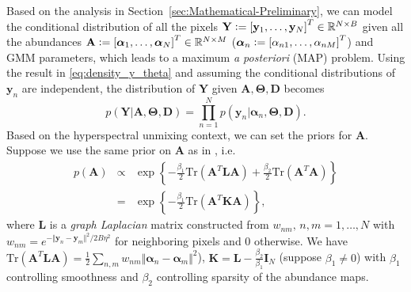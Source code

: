 \documentclass[twocolumn,english]{IEEEtran}
\theoremstyle{plain}
\begin{document}
Based on the analysis in Section~\ref{sec:Mathematical-Preliminary},
we can model the conditional distribution of all the pixels $\mathbf{Y}\vcentcolon=\left[\mathbf{y}_{1},\dots,\mathbf{y}_{N}\right]^{T}\in\mathbb{R}^{N\times B}$
given all the abundances $\mathbf{A}\vcentcolon=\left[\boldsymbol{\alpha}_{1},\dots,\boldsymbol{\alpha}_{N}\right]^{T}\in\mathbb{R}^{N\times M}$
($\boldsymbol{\alpha}_{n}\vcentcolon=\left[\alpha_{n1},\dots,\alpha_{nM}\right]^{T}$)
and GMM parameters, which leads to a maximum\emph{ a posteriori} (MAP)
problem. Using the result in \eqref{eq:density_y_theta} and assuming
the conditional distributions of $\mathbf{y}_{n}$ are independent,
the distribution of $\mathbf{Y}$ given $\mathbf{A},\boldsymbol{\Theta},\mathbf{D}$
becomes
\begin{equation}
p\left(\mathbf{Y}\vert\mathbf{A},\boldsymbol{\Theta},\mathbf{D}\right)=\prod_{n=1}^{N}p\left(\mathbf{y}_{n}\vert\boldsymbol{\alpha}_{n},\boldsymbol{\Theta},\mathbf{D}\right).\label{eq:density_Y_theta}
\end{equation}
Based on the hyperspectral unmixing context, we can set the priors
for $\mathbf{A}$. Suppose we use the same prior on $\mathbf{A}$
as in \cite{zhou2016spatial}, i.e. 
\begin{eqnarray}
p\left(\mathbf{A}\right) & \propto & \exp\left\{ -\frac{\beta_{1}}{2}\text{Tr}\left(\mathbf{A}^{T}\mathbf{L}\mathbf{A}\right)+\frac{\beta_{2}}{2}\text{Tr}\left(\mathbf{A}^{T}\mathbf{A}\right)\right\} \nonumber \\
 & = & \exp\left\{ -\frac{\beta_{1}}{2}\text{Tr}\left(\mathbf{A}^{T}\mathbf{K}\mathbf{A}\right)\right\} ,\label{eq:APdf}
\end{eqnarray}
where $\mathbf{L}$ is a \emph{graph Laplacian} matrix constructed
from $w_{nm},\,n,m=1,\dots,N$ with $w_{nm}=e^{-\Vert\mathbf{y}_{n}-\mathbf{y}_{m}\Vert^{2}/2B\eta^{2}}$
for neighboring pixels and 0 otherwise. We have $\text{Tr}\left(\mathbf{A}^{T}\mathbf{L}\mathbf{A}\right)=\frac{1}{2}\sum_{n,m}w_{nm}\Vert\boldsymbol{\alpha}_{n}-\boldsymbol{\alpha}_{m}\Vert^{2}$),
$\mathbf{K}=\mathbf{L}-\frac{\beta_{2}}{\beta_{1}}\mathbf{I}_{N}$
(suppose $\beta_{1}\neq0$) with $\beta_{1}$ controlling smoothness
and $\beta_{2}$ controlling sparsity of the abundance maps. 
\end{document}
